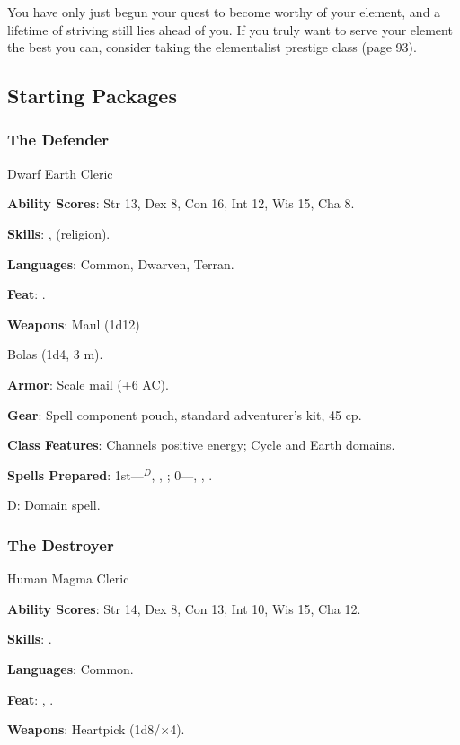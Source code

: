 You have only just begun your quest to become worthy of your element, and a lifetime of striving still lies ahead of you. If you truly want to serve your element the best you can, consider taking the elementalist prestige class (page 93).

\subsection{Starting Packages}
\subsubsection{The Defender}

Dwarf Earth Cleric

\textbf{Ability Scores}: Str 13, Dex 8, Con 16, Int 12, Wis 15, Cha 8.

\textbf{Skills}: ,  (religion).

\textbf{Languages}: Common, Dwarven, Terran.

\textbf{Feat}: .

\textbf{Weapons}: Maul (1d12)

Bolas (1d4, 3 m).

\textbf{Armor}: Scale mail (+6 AC).

\textbf{Gear}: Spell component pouch, standard adventurer's kit, 45 cp.

\textbf{Class Features}: Channels positive energy; Cycle and Earth domains.

\textbf{Spells Prepared}: 1st---$^D$, , ; 0---, , .

D: Domain spell.

\subsubsection{The Destroyer}

Human Magma Cleric

\textbf{Ability Scores}: Str 14, Dex 8, Con 13, Int 10, Wis 15, Cha 12.

\textbf{Skills}: .

\textbf{Languages}: Common.

\textbf{Feat}: , .

\textbf{Weapons}: Heartpick (1d8/$\times$4).

